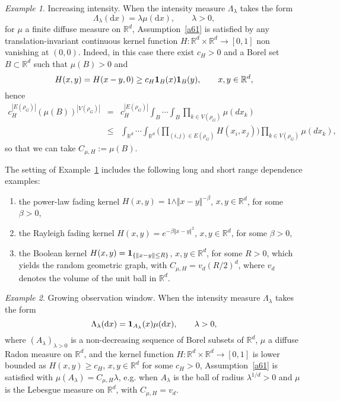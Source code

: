 \documentclass[bj,authoryear,noshowframe]{imsart}
\theoremstyle{plain}
\theoremstyle{remark}
\newtheorem*{example}{Example}
\newcommand{\R}{\mathbb{R}}
\newcommand{\bone}{{\bf 1}}
\def\real{{\mathord{\mathbb R}}}
\begin{document}
 
 
 \label{page1}
 \noindent
 \begin{example}
   \label{examplea}
   Increasing intensity. 
   When the intensity measure $\Lambda_\lambda$ takes the form 
 $$\Lambda_\lambda (\mathrm{d}x)=\lambda\mu(\mathrm{d}x),\qquad\lambda>0,$$
  for $\mu$ a finite diffuse measure on $\R^d$, 
  Assumption~\ref{a61} is satisfied by any translation-invariant
  continuous kernel function $H : \real^d\times \real^d \to [0,1]$ non vanishing at $(0,0)$. 
  Indeed, in this case there exist $c_H>0$ and a Borel set $B\subset \real^d$
  such that $\mu ( B)>0$ and
 $$
 H(x,y) = H(x-y,0) \geq c_H \bone_B(x)\bone_B(y), \qquad x,y \in \real^d,
 $$
 hence 
 \begin{eqnarray*} 
   c_H^{|E(\rho_G)|} ( \mu ( B ))^{|V(\rho_G)|} & = & 
   c_H^{|E(\rho_G)|}
   \int_B \cdots \int_B 
   \prod_{k\in V(\rho_G) } \mu (dx_k)
   \\
    & \leq &  
   \int_{\R^d}\cdots\int_{\R^d}
   \Bigg(
   \prod_{(i,j)\in E(\rho_G)} H(x_i,x_j)
   \Bigg)
   \prod_{k\in V(\rho_G) } \mu (dx_k), 
 \end{eqnarray*}
 so that we can take $C_{\mu , H} := \mu (B)$. 
 \end{example}
 The setting of Example~\ref{examplea}
  includes the following long and short range dependence examples: 
 \begin{enumerate} %
 \item
  the power-law fading kernel 
  $H(x,y) = 1 \wedge \Vert x - y \Vert^{- \beta}$, $x,y\in \real^d$, for some $\beta > 0$,  
 \item
  the Rayleigh fading kernel $H(x,y) = e^{ - \beta \Vert x - y\Vert^2}$, $x,y\in \real^d$, for some $\beta > 0$, 
 \item
  the Boolean kernel $H(x,y)=\bone_{\{\|x-y\|\leq R \}}$, $x,y\in \real^d$,
  for some $R >0$, which yields the random geometric graph, with
  $C_{\mu , H} = v_d (R /2)^d$,
  where $v_d$ denotes the volume of the unit ball in $\real^d$. 
 \end{enumerate}
 \vspace{-0.8cm}
 \noindent
 \label{page2}
 \begin{example}
   \label{exampleb}
   Growing observation window. 
   When the intensity measure $\Lambda_\lambda$ takes the form 
 $$\Lambda_\lambda (\mathrm{d}x)= {\bf 1}_{A_\lambda} (x) \mu(\mathrm{d}x),\qquad\lambda>0,$$
   where $(A_\lambda )_{\lambda >0}$ is a non-decreasing sequence
   of Borel subsets of $\real^d$, 
   $\mu$ a %
   diffuse Radon measure on $\R^d$, 
   and the kernel function $H : \real^d\times \real^d \to [0,1]$
   is lower bounded as $H(x,y) \geq c_H$, $x,y\in \real^d$ for some $c_H>0$,
   Assumption~\ref{a61} is satisfied with 
   $\mu ( A_\lambda ) = C_{\mu , H} \lambda$,
   e.g. when $A_\lambda$ is  the ball of radius $\lambda^{1/d} >0$
   and $\mu$ is the Lebesgue measure on $\real^d$,
   with $C_{\mu , H} = v_d$. 
 \end{example} 
 
\end{document}
